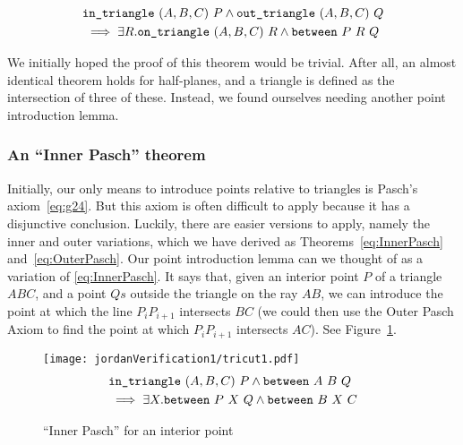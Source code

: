 \begin{multline}\label{eq:baseCase}
\texttt{in\_triangle}\ (A,B,C)\ P \wedge \texttt{out\_triangle}\ (A,B,C)\ Q \\\implies \exists R. \texttt{on\_triangle}\ (A,B,C)\ R \wedge \texttt{between}\ P\ R\ Q
\end{multline}

We initially hoped the proof of this theorem would be trivial. After all, an almost identical theorem holds for half-planes, and a triangle is defined as the intersection of three of these. Instead, we found ourselves needing another point introduction lemma.

\subsubsection{An ``Inner Pasch'' theorem}
Initially, our only means to introduce points relative to triangles is Pasch's axiom~\eqref{eq:g24}. But this axiom is often difficult to apply because it has a disjunctive conclusion. Luckily, there are easier versions to apply, namely the inner and outer variations, which we have derived as Theorems~\ref{eq:InnerPasch} and~\ref{eq:OuterPasch}. Our point introduction lemma can we thought of as a variation of \eqref{eq:InnerPasch}. It says that, given an interior point $P$ of a triangle $ABC$, and a point $Qs$ outside the triangle on the ray $AB$, we can introduce the point at which the line $P_iP_{i+1}$ intersects $BC$ (we could then use the Outer Pasch Axiom to find the point at which $P_iP_{i+1}$ intersects $AC$). See Figure~\ref{fig:tricut1}.

\begin{figure}
\centering\texttt{[image: jordanVerification1/tricut1.pdf]}
\begin{equation}\label{eq:tricut1}
  \begin{split}
    &\texttt{in\_triangle}\ (A,B,C)\ P \wedge \texttt{between}\ A\ B\ Q \\
    &\implies\exists X. \texttt{between}\ P\ X\ Q \wedge \texttt{between}\ B\ X\ C
  \end{split}
\end{equation}
\caption{``Inner Pasch'' for an interior point}
\label{fig:tricut1}
\end{figure}

